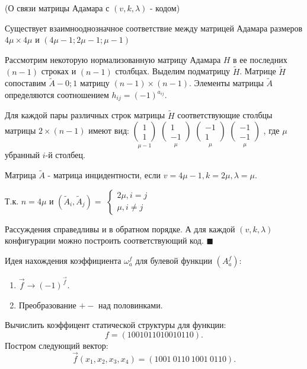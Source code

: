\thr (О связи матрицы Адамара с $(v, k, \lambda)$ - кодом)

Существует взаимнооднозначное соответствие между матрицей Адамара размеров $4\mu \times 4\mu$
и $(4\mu - 1; 2\mu - 1; \mu - 1)$

\proof
Рассмотрим некоторую нормализованную матрицу Адамара $H$ в ее последних $(n - 1)$ строках
и $(n - 1)$ столбцах. Выделим подматрицу $\tilde{H}$. Матрице $\tilde{H}$ сопоставим $\tilde{A} - 0;1$
матрицу $(n - 1)\times (n - 1)$. Элементы  матрицы $\tilde{A}$ определяются соотношением
$h_{ij} = (-1)^{a_{ij}}$.

Для каждой пары различных строк матрицы $\tilde{H}$ соответствующие столбцы матрицы $2\times (n - 1)$
имеют вид: 
$\underset{
\mu - 1
}{
\begin{pmatrix}
	1 \\
	1
\end{pmatrix}	
}$
$\underset{
\mu
}{
\begin{pmatrix}
	1 \\
	-1
\end{pmatrix}	
}$
$\underset{
\mu
}{
\begin{pmatrix}
	-1 \\
	1
\end{pmatrix}	
}$
$\underset{
\mu
}{
\begin{pmatrix}
	-1 \\
	-1
\end{pmatrix}	
}$
, где $\mu$ убранный $i$-й столбец.

Матрица $\tilde{A}$ - матрица инцидентности, если $v = 4\mu - 1, k = 2\mu, \lambda = \mu$.

Т.к. $n = 4\mu$ и $(\tilde{A}_i, \tilde{A}_j) = $
$\begin{cases}
	2\mu, i = j \\
	\mu, i\neq j
\end{cases}$

Рассуждения справедливы и в обратном порядке. А для каждой $(v, k, \lambda)$ конфигурации
можно построить соответствующий код. $\blacksquare$

Идея нахождения коэффициента $\omega_a^f$ для булевой функции $(A_a^f)$:
\begin{enumerate}
	\item $\overrightarrow{f} \rightarrow (-1)^{\overrightarrow{f}}$.
	\item Преобразование $+-$ над половинками.
\end{enumerate}

\examplei
Вычислить коэффицент статической структуры для функции:
$$
	f = (1 0 0 1 0 1 1 0 1 0 0 1 0 1 1 0).
$$
Постром следующий вектор:
$$
	\vec{f}(x_1, x_2, x_3, x_4) = (1 0 0 1 \  0110\  1001\  0110).
$$

